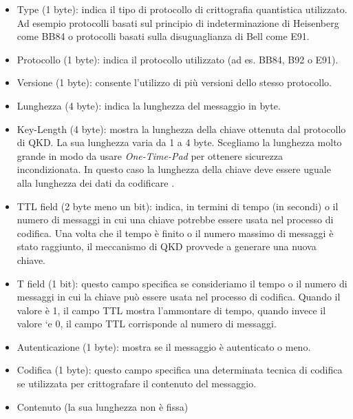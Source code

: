 \begin{itemize}
    \item Type (1 byte): indica il tipo di protocollo di crittografia quantistica utilizzato. Ad esempio protocolli basati sul principio di indeterminazione di Heisenberg come BB84 o protocolli basati sulla disuguaglianza di Bell come E91.
    
    \item Protocollo (1 byte): indica il protocollo utilizzato (ad es. BB84, B92 o E91).
    
    \item Versione (1 byte): consente l'utilizzo di più versioni dello stesso protocollo.
    
    \item Lunghezza (4 byte): indica la lunghezza del messaggio in byte.
    
    \item Key-Length (4 byte): mostra la lunghezza della chiave ottenuta dal protocollo di QKD. La sua lunghezza varia da 1 a 4 byte. Scegliamo la lunghezza molto grande in modo da usare \textit{One-Time-Pad} per ottenere sicurezza incondizionata. In questo caso la lunghezza della chiave deve essere uguale alla lunghezza dei dati da codificare \cite{shannon_communication_1949}.
    
    \item TTL field (2 byte meno un bit): indica, in termini di tempo (in secondi) o il numero di messaggi in cui una chiave potrebbe essere usata nel processo di codifica. Una volta che il tempo è finito o il numero massimo di messaggi è stato raggiunto, il meccanismo di QKD provvede a generare una nuova chiave.
    
    \item T field (1 bit): questo campo specifica se consideriamo il tempo o il numero di messaggi in cui la chiave può essere usata nel processo di codifica. Quando il valore è 1, il campo TTL mostra l’ammontare di tempo, quando invece il valore `e 0, il campo TTL corrisponde al numero di messaggi.
    
    \item Autenticazione (1 byte): mostra se il messaggio è autenticato o meno.
    
    \item Codifica (1 byte): questo campo specifica una determinata tecnica di codifica se utilizzata per crittografare il contenuto del messaggio.
    
    \item Contenuto (la sua lunghezza non è fissa)
\end{itemize}

